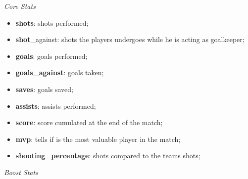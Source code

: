 \begin{center}
    \textit{Core Stats}
\end{center}
\begin{itemize}
    \item \textbf{shots}: shots performed;
    \item \textbf{shot}\_against: shots the players undergoes while he is acting as goalkeeper;
    \item \textbf{goals}: goals performed;
    \item \textbf{goals\_against}: goals taken; 
    \item \textbf{saves}: goals saved;
    \item \textbf{assists}: assists performed;
    \item \textbf{score}: score cumulated at the end of the match;
    \item \textbf{mvp}: tells if is the most valuable player in the match;
    \item \textbf{shooting\_percentage}: shots compared to the teams shots;
\end{itemize}
\begin{center}
    \textit{Boost Stats}
\end{center}
